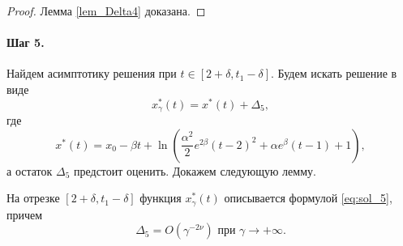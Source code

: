 \begin{proof}
Лемма \ref{lem_Delta4} доказана.

\end{proof}



\paragraph{Шаг 5.} Найдем асимптотику решения при $t \in [2 + \delta, t_1 - \delta]$. Будем искать решение в виде
\begin{equation}
	\label{eq:sol_5}
	x_\gamma^*(t) = x^*(t) + \Delta_5,
\end{equation}
%
где 
\[x^*(t) = x_0 - \beta t + \ln\left(\frac{\alpha^2}{2} e^{2\beta} (t - 2)^2 + \alpha e^{\beta}(t - 1) + 1 \right),\]
а остаток $\Delta_5$ предстоит оценить. Докажем следующую лемму.
%
\begin{lemma}
\label{lem_Delta5}
На отрезке $[2 + \delta, t_1 - \delta]$ функция $x_\gamma^*(t)$ описывается формулой \eqref{eq:sol_5}, причем
\[
\Delta_5 = O(\gamma^{-2\nu}) \text{ при } \gamma \to +\infty.
\]
\end{lemma}
